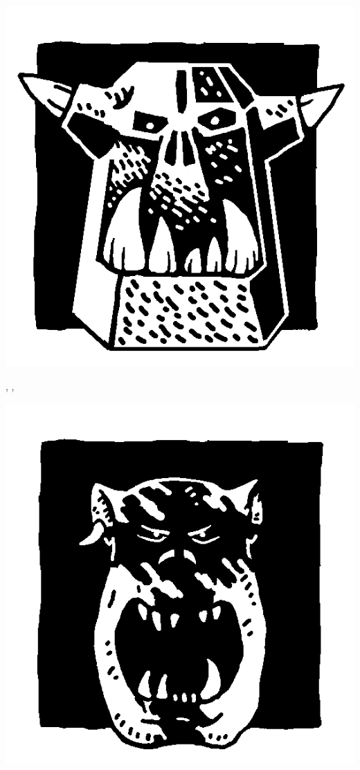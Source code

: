 \begin{multicols}{3}
\begin{center}
\includegraphics[width=\logosize]{pics/ironorc.png}
\vspace*{-1cm}\subsubtitle{\ironorc}

\vspace*{5pt}\immunetopsychology{}, \weaponmaster{}, \borntofight{}
\end{center}

\columnbreak

\begin{center}
\includegraphics[width=\logosize]{pics/feralorc.png}
\vspace*{-1cm}\subsubtitle{\feralorc}


\end{center}
\end{multicols}
